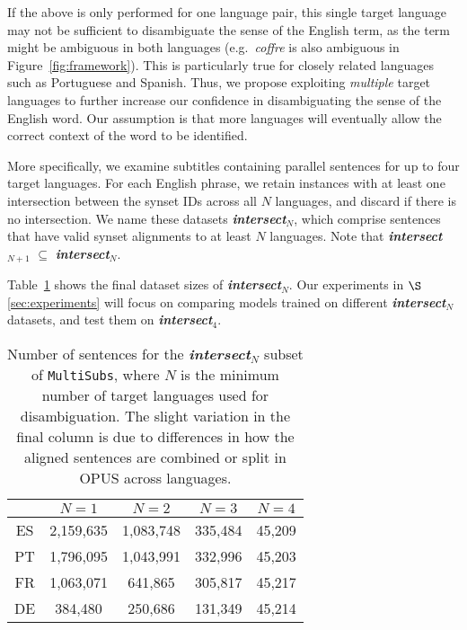 \documentclass[twocolumn]{svjour3}          \smartqed  \usepackage{graphicx}
\newcommand{\multisubs}{\texttt{MultiSubs}\xspace}
\begin{document}
If the above is only performed for one language pair, this single target language may not be sufficient to disambiguate the sense of the English term, as the term might be ambiguous in both languages (e.g.\ \textit{coffre} is also ambiguous in Figure~\ref{fig:framework}). This is particularly true for closely related languages such as Portuguese and Spanish. Thus, we propose exploiting \emph{multiple} target languages to further increase our confidence in disambiguating the sense of the English word. Our assumption is that more languages will eventually allow the correct context of the word to be identified. 





More specifically, we examine subtitles containing parallel sentences for up to four target languages. For each English phrase, we retain instances with at least one intersection between the synset IDs across all $N$ languages, and discard if there is no intersection. We name these datasets \textbf{\textit{intersect$_N$}}, which comprise sentences that have valid synset alignments to at least $N$ languages. Note that \textbf{\textit{intersect$_{N+1}$}} $\subseteq$ \textbf{\textit{intersect$_N$}}.

Table~\ref{tbl:stats-dataset-size} shows the final dataset sizes of \textbf{\textit{intersect$_N$}}. Our experiments in $\S$\ref{sec:experiments} will focus on comparing models trained on different \textbf{\textit{intersect$_N$}} datasets, and test them on \textbf{\textit{intersect$_4$}}. 



\begin{table}[t]
\caption{Number of sentences for the \textbf{\textit{intersect$_N$}} subset of \multisubs,    where $N$ is the minimum number of target languages used for disambiguation. The slight variation in the final column is due to differences in how the aligned sentences are combined or split in OPUS across languages.}
	\label{tbl:stats-dataset-size}
\small
	\centering
\begin{tabular}{@{}ccccc@{}}
			\toprule
              \noalign{\smallskip}
			  & $N=1$ & $N=2$ & $N=3$ & $N=4$  \\
			\midrule
 ES & 2,159,635 & 1,083,748 & 335,484 & 45,209 \\
 PT & 1,796,095 & 1,043,991 & 332,996 & 45,203 \\
 FR & 1,063,071 & 641,865 & 305,817 & 45,217 \\
 DE & 384,480 & 250,686 & 131,349 & 45,214 \\
			\bottomrule
		\end{tabular}
\end{table}
\end{document}
